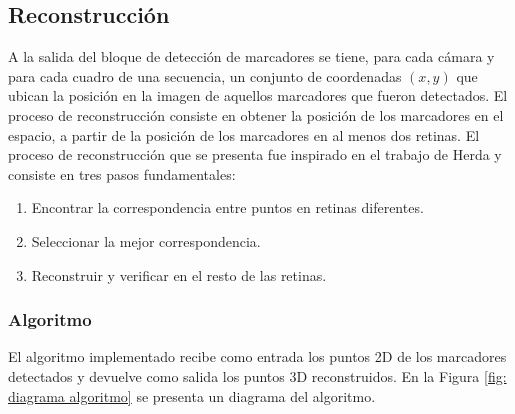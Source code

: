 \subsection{Reconstrucción}
A la salida del bloque de detección de marcadores se tiene, para cada cámara y para cada cuadro de una secuencia, un conjunto de coordenadas $(x,y)$ que ubican la posición en la imagen de aquellos marcadores que fueron detectados.
El proceso de reconstrucción consiste en obtener la posición de los marcadores en el espacio, a partir de la posición de los marcadores en al menos dos retinas.
%
%
El proceso de reconstrucción que se presenta fue inspirado en el trabajo de Herda y consiste en tres pasos fundamentales:

\begin{enumerate}
\item Encontrar la correspondencia entre puntos en retinas diferentes.
\item Seleccionar la mejor correspondencia.
\item Reconstruir y verificar en el resto de las retinas.
\end{enumerate}

\subsubsection{Algoritmo}
El algoritmo implementado recibe como entrada los puntos 2D de los marcadores detectados y devuelve como salida los puntos 3D reconstruidos. 
En la Figura \ref{fig: diagrama algoritmo} se presenta un diagrama del algoritmo.

